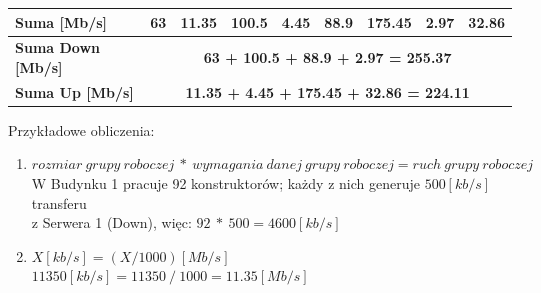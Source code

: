 \documentclass{article}
\begin{document}
\begin{table}[H]
\begin{tabular}{|l|c|c|c|c|c|c|c|c|}
	\textbf{Suma {[}Mb/s{]}}                                                                          & 63            & 11.35         & 100.5          & 4.45         & 88.9          & 175.45        & 2.97          & 32.86         \\ \hline
	\textbf{Suma Down {[}Mb/s{]}}                                                                     & \multicolumn{8}{c|}{\textbf{63 + 100.5 + 88.9 + 2.97 = 255.37}}                                                               \\ \hline
	\textbf{Suma Up {[}Mb/s{]}}                                                                       & \multicolumn{8}{c|}{\textbf{11.35 + 4.45 + 175.45 + 32.86 = 224.11}}                                                          \\ \hline
\end{tabular}
\end{table}
\par Przykładowe obliczenia:
\begin{enumerate}
	\item  $ rozmiar \ grupy \ roboczej \ * \ wymagania \ danej \ grupy \ roboczej = ruch \ grupy \ roboczej $ 
	\\ W Budynku 1 pracuje 92 konstruktorów; każdy z nich generuje $ 500 [kb/s] $ transferu \\ z Serwera 1 (Down), więc: $ 92 \ * \ 500 = 46 00 [kb/s] $
	\item $ X[kb/s] = (X/1000)[Mb/s] $ 
	\\ $ 11350 [kb/s] = 11350 \ / \ 1000 = 11.35[Mb/s] $
\end{enumerate}
\end{document}
